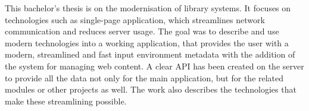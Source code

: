 \documentclass[12pt]{report}
\begin{document}
This bachelor's thesis is on the modernisation of library systems.
It focuses on technologies such as single-page application, which streamlines
network communication and reduces server usage.
The goal was to describe and use modern technologies into a working application,
that provides the user with a modern, streamlined and fast input environment
metadata with the addition of the system for managing web content.
A clear API has been created on the server to provide all the data not only for the
main application, but for the related modules or other projects as well.
The work also describes the technologies that make these
streamlining possible.
\end{document}
